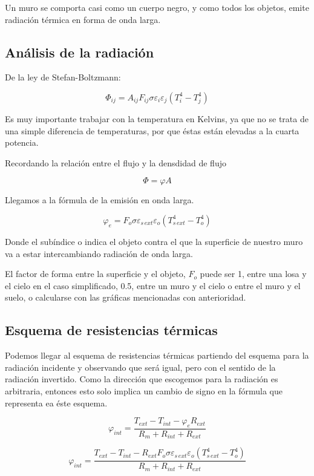 \documentclass[11pt]{article}
\begin{document}
Un muro se comporta casi como un cuerpo negro, y como todos los objetos, emite radiación térmica en forma de onda larga.

\subsection{Análisis de la radiación}

De la ley de Stefan-Boltzmann:

\[ \Phi _{ ij } = A_{ ij } F_{ ij } \sigma \varepsilon _i \varepsilon _j \left( T_i^4 - T_j^4 \right) \]

Es muy importante trabajar con la temperatura en Kelvins, ya que no se trata de una simple diferencia de temperaturas, por que éstas están elevadas a la cuarta potencia.

Recordando la relación entre el flujo y la densdidad de flujo

\[ \Phi = \varphi A \]

Llegamos a la fórmula de la emisión en onda larga.

\[ \varphi _e = F_o \sigma \varepsilon _{ s \, ext } \varepsilon _o \left( T_{ s\, ext }^4 - T_o^4 \right) \]

Donde el subíndice o indica el objeto contra el que la superficie de nuestro muro va a estar intercambiando radiación de onda larga.

El factor de forma entre la superficie y el objeto, $ F_o $ puede ser 1, entre una losa y el cielo en el caso simplificado, 0.5, entre un muro y el cielo o entre el muro y el suelo, o calcularse con las gráficas mencionadas con anterioridad.

\subsection{Esquema de resistencias térmicas}

Podemos llegar al esquema de resistencias térmicas partiendo del esquema para la radiación incidente y observando que será igual, pero con el sentido de la radiación invertido. Como la dirección que escogemos para la radiación es arbitraria, entonces esto solo implica un cambio de signo en la fórmula que representa ea éste esquema.

\[ \varphi _{ int } = \frac{ T_{ ext} - T_{ int } - \varphi _e R_{ ext } }{ R_m + R_{ int } + R_{ ext } } \]

\[ \varphi _{ int } = \frac{ T_{ ext} - T_{ int } - R_{ ext } F_o \sigma \varepsilon _{ s \, ext } \varepsilon _o \left( T_{ s\, ext }^4 - T_o^4 \right) }{ R_m + R_{ int } + R_{ ext } } \]
\end{document}
